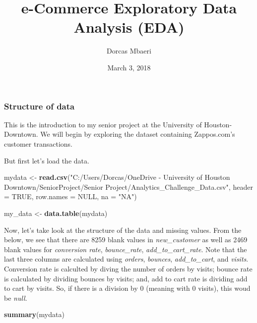 \documentclass[]{article}
\title{e-Commerce Exploratory Data Analysis (EDA)}
\author{Dorcas Mbaeri}
\date{March 3, 2018}
\newenvironment{Shaded}{\begin{snugshade}}{\end{snugshade}}
\newcommand{\KeywordTok}[1]{\textcolor[rgb]{0.13,0.29,0.53}{\textbf{{#1}}}}
\newcommand{\DataTypeTok}[1]{\textcolor[rgb]{0.13,0.29,0.53}{{#1}}}
\newcommand{\StringTok}[1]{\textcolor[rgb]{0.31,0.60,0.02}{{#1}}}
\newcommand{\OtherTok}[1]{\textcolor[rgb]{0.56,0.35,0.01}{{#1}}}
\newcommand{\NormalTok}[1]{{#1}}
\begin{document}
\maketitle

\subsubsection{Structure of data}\label{structure-of-data}

This is the introduction to my senior project at the University of
Houston-Downtown. We will begin by exploring the dataset containing
Zappos.com's customer transactions.

But first let's load the data.

\begin{Shaded}
\begin{Highlighting}[]
\NormalTok{mydata <-}\StringTok{ }\KeywordTok{read.csv}\NormalTok{(}\StringTok{"C:/Users/Dorcas/OneDrive - University of Houston Downtown/SeniorProject/Senior Project/Analytics_Challenge_Data.csv"}\NormalTok{, }\DataTypeTok{header =} \OtherTok{TRUE}\NormalTok{, }\DataTypeTok{row.names =} \OtherTok{NULL}\NormalTok{, }\DataTypeTok{na =} \StringTok{"NA"}\NormalTok{)}

\NormalTok{my_data <-}\StringTok{ }\KeywordTok{data.table}\NormalTok{(mydata)}
\end{Highlighting}
\end{Shaded}

\newline
\newline

Now, let's take look at the structure of the data and missing values.
From the below, we see that there are 8259 blank values in
\emph{new\_customer} as well as 2469 blank values for \emph{conversion
rate}, \emph{bounce\_rate}, \emph{add\_to\_cart\_rate}. Note that the
last three columns are calculated using \emph{orders}, \emph{bounces},
\emph{add\_to\_cart}, and \emph{visits}. Conversion rate is calculted by
diving the number of orders by visits; bounce rate is calculated by
dividing bounces by visits; and, add to cart rate is dividing add to
cart by visits. So, if there is a division by 0 (meaning with 0 visits),
this woud be \emph{null}.

\begin{Shaded}
\begin{Highlighting}[]
\KeywordTok{summary}\NormalTok{(mydata)}
\end{Highlighting}
\end{Shaded}
\end{document}
